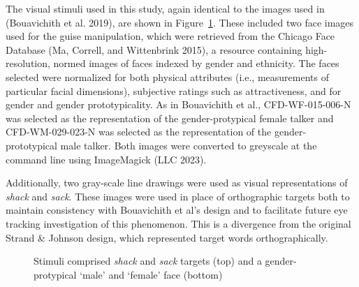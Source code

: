 \documentclass[
  letterpaper,
  DIV=11,
  numbers=noendperiod]{scrartcl}
\begin{document}
The visual stimuli used in this study, again identical to the images
used in (Bouavichith et al. 2019), are shown in Figure~\ref{fig-visual}.
These included two face images used for the guise manipulation, which
were retrieved from the Chicago Face Database (Ma, Correll, and
Wittenbrink 2015), a resource containing high-resolution, normed images
of faces indexed by gender and ethnicity. The faces selected were
normalized for both physical attributes (i.e., measurements of
particular facial dimensions), subjective ratings such as
attractiveness, and for gender and gender prototypicality. As in
Bouavichith et al., CFD-WF-015-006-N was selected as the representation
of the gender-protypical female talker and CFD-WM-029-023-N was selected
as the representation of the gender-prototypical male talker. Both
images were converted to greyscale at the command line using ImageMagick
(LLC 2023).

Additionally, two gray-scale line drawings were used as visual
representations of \emph{shack} and \emph{sack}. These images were used
in place of orthographic targets both to maintain consistency with
Bouavichith et al's design and to facilitate future eye tracking
investigation of this phenomenon. This is a divergence from the original
Strand \& Johnson design, which represented target words
orthographically.

\begin{figure}


\caption{\label{fig-visual}Stimuli comprised \emph{shack} and
\emph{sack} targets (top) and a gender-protypical `male' and `female'
face (bottom)}

\end{figure}%
\end{document}
